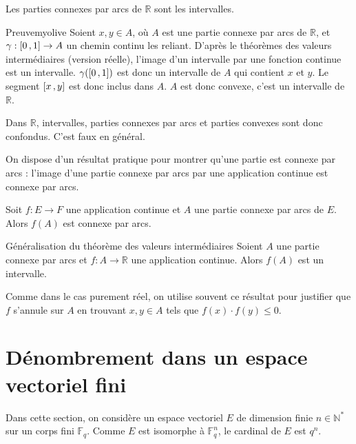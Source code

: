     \begin{prop}{}{}
        Les parties connexes par arcs de $\mathbb{R}$ sont les intervalles.
    \end{prop}

    \begin{demo}{Preuve}{myolive}
        Soient $x,y \in A$, où $A$ est une partie connexe par arcs de $\mathbb{R}$, et $\gamma : \left[ 0 \, , 1 \right] \rightarrow A$ un chemin continu les reliant. D’après le théorèmes des valeurs intermédiaires (version réelle), l’image d’un intervalle par une fonction continue est un intervalle. $\gamma(\left[ 0 \, , 1 \right])$ est donc un intervalle de $A$ qui contient $x$ et $y$. Le segment $\left[ x \, , y \right]$ est donc inclus dans $A$. $A$ est donc convexe, c’est un intervalle de $\mathbb{R}$.
    \end{demo}

    Dans $\mathbb{R}$, intervalles, parties connexes par arcs et parties convexes sont donc confondus. C’est faux en général.

    On dispose d’un résultat pratique pour montrer qu’une partie est connexe par arcs : l’image d’une partie connexe par arcs par une application continue est connexe par arcs.

    \begin{theo}{}{}
        Soit $f : E \rightarrow F$ une application continue et $A$ une partie connexe par arcs de $E$. Alors $f(A)$ est connexe par arcs.
    \end{theo}

    \begin{coro}{Généralisation du théorème des valeurs intermédiaires}{}
        Soient $A$ une partie connexe par arcs et $f : A \rightarrow \mathbb{R}$ une application continue. Alors $f(A)$ est un intervalle.
    \end{coro}

    Comme dans le cas purement réel, on utilise souvent ce résultat pour justifier que $f$ s’annule sur $A$ en trouvant $x,y \in A$ tels que $f(x) \cdot f(y) \leq 0$.

\section[Dénombremement dans un ev fini]{Dénombrement dans un espace vectoriel fini}

Dans cette section, on considère un espace vectoriel $E$ de dimension finie $n \in \mathbb{N}^*$ sur un corps fini $\mathbb{F}_q$. Comme $E$ est isomorphe à $\mathbb{F}_q^n$, le cardinal de $E$ est $q^n$.

